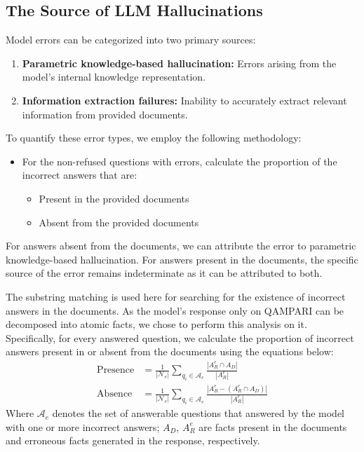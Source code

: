 \documentclass{article} %
\renewcommand{\cite}[1]{\citep{#1}}
\begin{document}
\subsection{The Source of LLM Hallucinations}
\label{sec: source-of-errors_app}
Model errors can be categorized into two primary sources:

\begin{enumerate}
    \item \textbf{Parametric knowledge-based hallucination:} Errors arising from the model's internal knowledge representation.
    \item \textbf{Information extraction failures:} Inability to accurately extract relevant information from provided documents.
\end{enumerate}

To quantify these error types, we employ the following methodology:

\begin{itemize}
    \item For the non-refused questions with errors, calculate the proportion of the incorrect answers that are:
    \begin{itemize}
        \item[$\circ$] Present in the provided documents
        \item[$\circ$] Absent from the provided documents
    \end{itemize}
\end{itemize}

For answers absent from the documents, we can attribute the error to parametric knowledge-based hallucination. For answers present in the documents, the specific source of the error remains indeterminate as it can be attributed to both. 

The substring matching \cite{gao2023enabling} is used here for searching for the existence of incorrect answers in the documents. As the model's response only on QAMPARI can be decomposed into atomic facts, we chose to perform this analysis on it. Specifically, for every answered question, we calculate the proportion of incorrect answers present in or absent from the documents using the equations below: 
%
\begin{align}
    \text{Presence} &= \frac{1}{|\mathcal{N}_e|} \sum_{q_i \in  {\mathcal{A}_e}} \frac{|A_R^e \cap A_D|}{|A_R^e|} \\
    \text{Absence} &= \frac{1}{|\mathcal{N}_e|} \sum_{q_i \in  {\mathcal{A}_e}} \frac{|A_R^e - (A_R^e \cap A_D)|}{|A_R^e|}
\end{align}
%
Where $\mathcal{A}_e$ denotes the set of answerable questions that answered by the model with one or more incorrect answers; $A_D$, $A_R^e$ are facts present in the documents and erroneous facts generated in the response, respectively.
\end{document}
